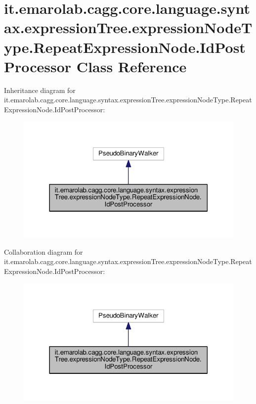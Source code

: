 \hypertarget{classit_1_1emarolab_1_1cagg_1_1core_1_1language_1_1syntax_1_1expressionTree_1_1expressionNodeTypee265c5385dc11a583b6493cfac9b7ab}{\section{it.\-emarolab.\-cagg.\-core.\-language.\-syntax.\-expression\-Tree.\-expression\-Node\-Type.\-Repeat\-Expression\-Node.\-Id\-Post\-Processor Class Reference}
\label{classit_1_1emarolab_1_1cagg_1_1core_1_1language_1_1syntax_1_1expressionTree_1_1expressionNodeTypee265c5385dc11a583b6493cfac9b7ab}
}


Inheritance diagram for it.\-emarolab.\-cagg.\-core.\-language.\-syntax.\-expression\-Tree.\-expression\-Node\-Type.\-Repeat\-Expression\-Node.\-Id\-Post\-Processor\-:\nopagebreak
\begin{figure}[H]
\begin{center}
\leavevmode
\includegraphics[width=320pt]{classit_1_1emarolab_1_1cagg_1_1core_1_1language_1_1syntax_1_1expressionTree_1_1expressionNodeTyp2c77d20bdbf9e7e370c3f1270623eac3}
\end{center}
\end{figure}


Collaboration diagram for it.\-emarolab.\-cagg.\-core.\-language.\-syntax.\-expression\-Tree.\-expression\-Node\-Type.\-Repeat\-Expression\-Node.\-Id\-Post\-Processor\-:\nopagebreak
\begin{figure}[H]
\begin{center}
\leavevmode
\includegraphics[width=320pt]{classit_1_1emarolab_1_1cagg_1_1core_1_1language_1_1syntax_1_1expressionTree_1_1expressionNodeTypd5231c89d68db4c401aa3d51bf19f12c}
\end{center}
\end{figure}
